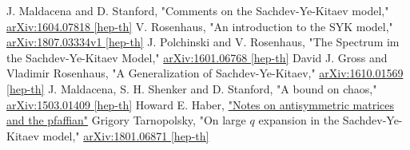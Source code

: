 \begin{thebibliography}{99}
		J. Maldacena and D. Stanford,
		"Comments on the Sachdev-Ye-Kitaev model,"
		\href{https://arxiv.org/pdf/1604.07818.pdf}{arXiv:1604.07818 [hep-th]}
		V. Rosenhaus,
		"An introduction to the SYK model,"
		\href{https://arxiv.org/pdf/1807.03334.pdf}{arXiv:1807.03334v1 [hep-th]}
		J. Polchinski and V. Rosenhaus,
		"The Spectrum im the Sachdev-Ye-Kitaev Model,"
		\href{https://arxiv.org/pdf/1601.06768.pdf}{arXiv:1601.06768 [hep-th]}
		David J. Gross and Vladimir Rosenhaus,
		"A Generalization of Sachdev-Ye-Kitaev,"
		\href{https://arxiv.org/pdf/1610.01569.pdf}{arXiv:1610.01569 [hep-th]}
	J. Maldacena, S. H. Shenker and D. Stanford,
	"A bound on chaos,"
	\href{https://arxiv.org/pdf/1503.01409.pdf}{arXiv:1503.01409 [hep-th]}
	Howard E. Haber,
	\href{http://scipp.ucsc.edu/~haber/webpage/pfaffian2.pdf}{"Notes on antisymmetric matrices and the pfaffian"}
		Grigory Tarnopolsky,
		"On large $q$ expansion in the Sachdev-Ye-Kitaev model,"
		\href{https://arxiv.org/pdf/1801.06871.pdf}{arXiv:1801.06871 [hep-th]}
\end{thebibliography}
